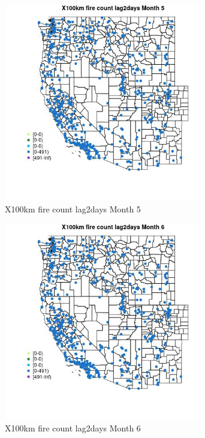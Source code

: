 \begin{figure} 
\centering  
\includegraphics[width=0.77\textwidth]{Code_Outputs/Report_ML_input_PM25_Step4_part_e_de_duplicated_aves_compiled_2019-05-14wNAs_MapObsMo5X100km_fire_count_lag2days.jpg} 
\caption{\label{fig:Report_ML_input_PM25_Step4_part_e_de_duplicated_aves_compiled_2019-05-14wNAsMapObsMo5X100km_fire_count_lag2days}X100km fire count lag2days Month 5} 
\end{figure} 
 

\clearpage 

\begin{figure} 
\centering  
\includegraphics[width=0.77\textwidth]{Code_Outputs/Report_ML_input_PM25_Step4_part_e_de_duplicated_aves_compiled_2019-05-14wNAs_MapObsMo6X100km_fire_count_lag2days.jpg} 
\caption{\label{fig:Report_ML_input_PM25_Step4_part_e_de_duplicated_aves_compiled_2019-05-14wNAsMapObsMo6X100km_fire_count_lag2days}X100km fire count lag2days Month 6} 
\end{figure} 
 

